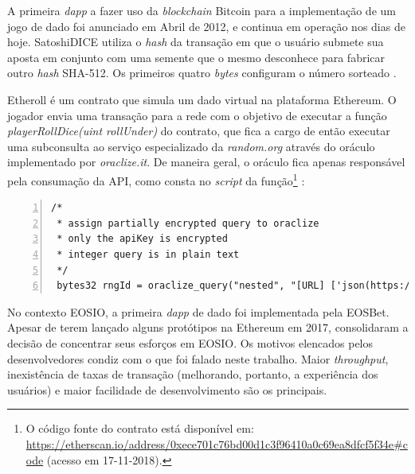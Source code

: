 \documentclass[a4paper,12pt]{monografia}
\theoremstyle{plain}
\theoremstyle{definition}
\theoremstyle{remark}
\begin{document}
A primeira \textit{dapp} a fazer uso da \textit{blockchain} Bitcoin para a implementa\c{c}\~ao de um jogo de dado foi anunciado em Abril de 2012, e continua em opera\c{c}\~ao nos dias de hoje.
SatoshiDICE utiliza o \textit{hash} da transa\c{c}\~ao em que o usu\'ario submete sua aposta em conjunto com uma semente que o mesmo desconhece para fabricar outro \textit{hash} SHA-512.
Os primeiros quatro \textit{bytes} configuram o n\'umero sorteado \cite{satoshidice}.

Etheroll \'e um contrato que simula um dado virtual na plataforma Ethereum.
O jogador envia uma transa\c{c}\~{a}o para a rede com o objetivo de executar a fun\c{c}\~{a}o \textit{playerRollDice(uint rollUnder)} do contrato, que fica a cargo de ent\~{a}o executar uma subconsulta ao servi\c{c}o especializado da \textit{random.org} atrav\'{e}s do or\'{a}culo implementado por \textit{oraclize.it}.
De maneira geral, o or\'{a}culo fica apenas respons\'{a}vel pela consuma\c{c}\~{a}o da API, como consta no \textit{script} da fun\c{c}\~{a}o\footnote{O c\'{o}digo fonte do contrato est\'a dispon\'ivel em: \url{https://etherscan.io/address/0xece701c76bd00d1c3f96410a0c69ea8dfcf5f34e\#code} (acesso em 17-11-2018).} \cite{etheroll}:

\lstset{tabsize=5,language=Python,showstringspaces=false,basicstyle=\ttfamily\small,keywordstyle=\bf,breaklines=true}
\begin{singlespacing}
\begin{lstlisting}[frame=single,framexrightmargin=1pt,numbers=left]
 /*
 * assign partially encrypted query to oraclize
 * only the apiKey is encrypted 
 * integer query is in plain text
 */        
 bytes32 rngId = oraclize_query("nested", "[URL] ['json(https://api.random.org/json-rpc/1/invoke).result.random[\"serialNumber\",\"data\"]', '\\n{\"jsonrpc\":\"2.0\",\"method\":\"generateSignedIntegers\",\"params\":{\"apiKey\":${[decrypt] BLTr+ZtMOLP2SQVXx8GRscYuXv+3wY5zdFgrQZNMMY3oO/6C7OoQkgu3KgfBuiJWW1S3U/+ya10XFGHv2P7MB7VYwFIZd3VOMI/Os8o1uJCdGGZgpR0Dkm5QoNH7MbDM0wa2RewBqlVLFGoZX1PJC+igBPNoHC4=},\"n\":1,\"min\":1,\"max\":100,\"replacement\":true,\"base\":10${[identity] \"}\"},\"id\":1${[identity] \"}\"}']", gasForOraclize);
\end{lstlisting}
\end{singlespacing}

No contexto EOSIO, a primeira \textit{dapp} de dado foi implementada pela EOSBet.
Apesar de terem lan\c{c}ado alguns prot\'otipos na Ethereum em 2017, consolidaram a decis\~ao de concentrar seus esfor\c{c}os em EOSIO.
Os motivos elencados pelos desenvolvedores condiz com o que foi falado neste trabalho.
Maior \textit{throughput}, inexist\^encia de taxas de transa\c{c}\~ao (melhorando, portanto, a experi\^encia dos usu\'arios) e maior facilidade de desenvolvimento s\~ao os principais.
\end{document}
